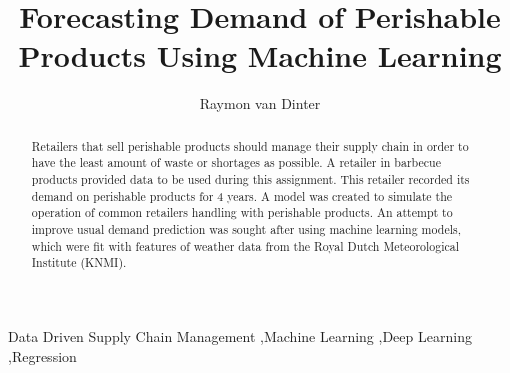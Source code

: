 \documentclass[final,authoryear,5p,times,twocolumn, 11pt]{elsarticle}
\begin{document}
\begin{frontmatter}



\title{Forecasting Demand of Perishable Products Using Machine Learning}


\author{Raymon van Dinter}
\address{ORL-33806\\Data Driven Supply Chain Management\\Wageningen University and Research}

\begin{abstract}
Retailers that sell perishable products should manage their supply chain in order to have the least amount of waste or shortages as possible. A retailer in barbecue products provided data to be used during this assignment. This retailer recorded its demand on perishable products for 4 years. A model was created to simulate the operation of common retailers handling with perishable products. An attempt to improve usual demand prediction was sought after using machine learning models, which were fit with features of weather data from the Royal Dutch Meteorological Institute (KNMI).
\end{abstract}

\begin{keyword}
Data Driven Supply Chain Management \sep Machine Learning \sep Deep Learning \sep Regression

\end{keyword}

\end{frontmatter}
\end{document}
